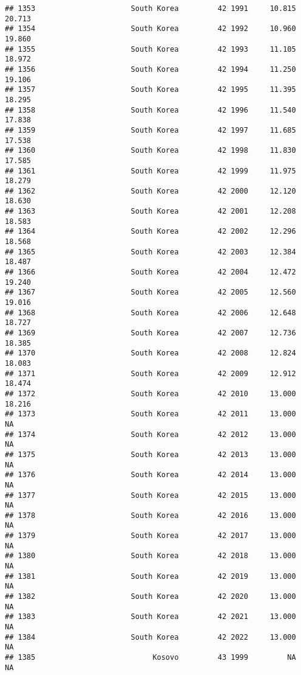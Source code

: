 \documentclass[
]{article}
\begin{document}
\begin{verbatim}
## 1353                      South Korea         42 1991     10.815     20.713
## 1354                      South Korea         42 1992     10.960     19.860
## 1355                      South Korea         42 1993     11.105     18.972
## 1356                      South Korea         42 1994     11.250     19.106
## 1357                      South Korea         42 1995     11.395     18.295
## 1358                      South Korea         42 1996     11.540     17.838
## 1359                      South Korea         42 1997     11.685     17.538
## 1360                      South Korea         42 1998     11.830     17.585
## 1361                      South Korea         42 1999     11.975     18.279
## 1362                      South Korea         42 2000     12.120     18.630
## 1363                      South Korea         42 2001     12.208     18.583
## 1364                      South Korea         42 2002     12.296     18.568
## 1365                      South Korea         42 2003     12.384     18.487
## 1366                      South Korea         42 2004     12.472     19.240
## 1367                      South Korea         42 2005     12.560     19.016
## 1368                      South Korea         42 2006     12.648     18.727
## 1369                      South Korea         42 2007     12.736     18.385
## 1370                      South Korea         42 2008     12.824     18.083
## 1371                      South Korea         42 2009     12.912     18.474
## 1372                      South Korea         42 2010     13.000     18.216
## 1373                      South Korea         42 2011     13.000         NA
## 1374                      South Korea         42 2012     13.000         NA
## 1375                      South Korea         42 2013     13.000         NA
## 1376                      South Korea         42 2014     13.000         NA
## 1377                      South Korea         42 2015     13.000         NA
## 1378                      South Korea         42 2016     13.000         NA
## 1379                      South Korea         42 2017     13.000         NA
## 1380                      South Korea         42 2018     13.000         NA
## 1381                      South Korea         42 2019     13.000         NA
## 1382                      South Korea         42 2020     13.000         NA
## 1383                      South Korea         42 2021     13.000         NA
## 1384                      South Korea         42 2022     13.000         NA
## 1385                           Kosovo         43 1999         NA         NA

\end{verbatim}
\end{document}
